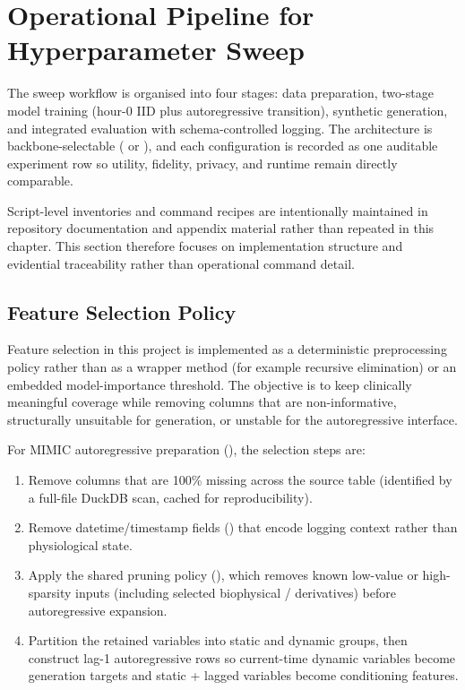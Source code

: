 \section{Operational Pipeline for Hyperparameter Sweep}

The sweep workflow is organised into four stages: data preparation, two-stage model training (hour-0 IID plus autoregressive transition), synthetic generation, and integrated evaluation with schema-controlled logging. The architecture is backbone-selectable ( or ), and each configuration is recorded as one auditable experiment row so utility, fidelity, privacy, and runtime remain directly comparable.

Script-level inventories and command recipes are intentionally maintained in repository documentation and appendix material rather than repeated in this chapter. This section therefore focuses on implementation structure and evidential traceability rather than operational command detail.

\subsection{Feature Selection Policy}
\label{sec:feature-selection-policy}

Feature selection in this project is implemented as a deterministic preprocessing policy rather than as a wrapper method (for example recursive elimination) or an embedded model-importance threshold.
The objective is to keep clinically meaningful coverage while removing columns that are non-informative, structurally unsuitable for generation, or unstable for the autoregressive interface.

For MIMIC autoregressive preparation (), the selection steps are:
\begin{enumerate}\tightlist
    \item Remove columns that are 100\% missing across the source table (identified by a full-file DuckDB scan, cached for reproducibility).
    \item Remove datetime/timestamp fields () that encode logging context rather than physiological state.
    \item Apply the shared pruning policy (), which removes known low-value or high-sparsity inputs (including selected biophysical / derivatives) before autoregressive expansion.
    \item Partition the retained variables into static and dynamic groups, then construct lag-1 autoregressive rows so current-time dynamic variables become generation targets and static + lagged variables become conditioning features.
\end{enumerate}

